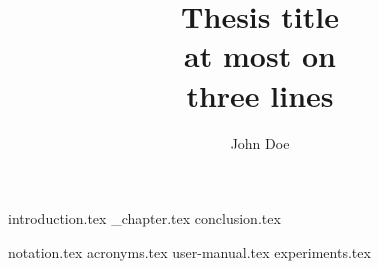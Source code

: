 \documentclass[english,DP]{thesiskiv}
\author          {John Doe}
\title           {Thesis title\\ at most on\\ three lines}
\begin{document}
  \makefront

  {introduction.tex}
  {_chapter.tex}
  {conclusion.tex}

  

  \appendix
  {notation.tex}
  {acronyms.tex}
  {user-manual.tex}
  {experiments.tex}
\end{document}
